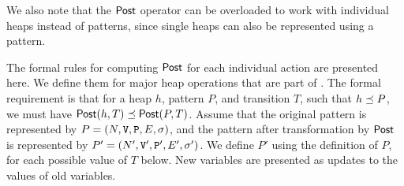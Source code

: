 We also note that the $\mathsf{Post}$ operator can be overloaded to work with individual heaps instead of patterns, since single heaps can also be represented using a pattern.

The formal rules for computing $\mathsf{Post}$ for each individual action are presented here. We define them for major heap operations that are part of \lang. The formal requirement is that for a heap $h$, pattern $P$, and transition $T$, such that $h \preceq P$, we must have $\mathsf{Post}(h, T) \preceq \mathsf{Post}(P, T)$. Assume that the original pattern is represented by $P = (N, \mathtt{V}, \mathtt{P}, E, \sigma)$, and the pattern after transformation by $\mathsf{Post}$ is represented by $P' = (N', \mathtt{V}', \mathtt{P}', E', \sigma')$. We define $P'$ using the definition of $P$, for each possible value of $T$ below. New variables are presented as updates to the values of old variables.

